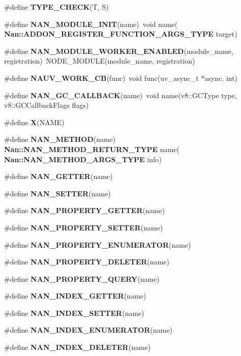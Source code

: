 \begin{DoxyCompactItemize}
\#define \textbf{ T\+Y\+P\+E\+\_\+\+C\+H\+E\+CK}(T,  S)
\item 
\#define \textbf{ N\+A\+N\+\_\+\+M\+O\+D\+U\+L\+E\+\_\+\+I\+N\+IT}(name)~void name(\textbf{ Nan\+::\+A\+D\+D\+O\+N\+\_\+\+R\+E\+G\+I\+S\+T\+E\+R\+\_\+\+F\+U\+N\+C\+T\+I\+O\+N\+\_\+\+A\+R\+G\+S\+\_\+\+T\+Y\+PE} target)
\item 
\#define \textbf{ N\+A\+N\+\_\+\+M\+O\+D\+U\+L\+E\+\_\+\+W\+O\+R\+K\+E\+R\+\_\+\+E\+N\+A\+B\+L\+ED}(module\+\_\+name,  registration)~N\+O\+D\+E\+\_\+\+M\+O\+D\+U\+LE(module\+\_\+name, registration)
\item 
\#define \textbf{ N\+A\+U\+V\+\_\+\+W\+O\+R\+K\+\_\+\+CB}(func)~void func(uv\+\_\+async\+\_\+t $\ast$async, int)
\item 
\#define \textbf{ N\+A\+N\+\_\+\+G\+C\+\_\+\+C\+A\+L\+L\+B\+A\+CK}(name)~void name(v8\+::\+G\+C\+Type type, v8\+::\+G\+C\+Callback\+Flags flags)
\item 
\#define \textbf{ X}(N\+A\+ME)
\item 
\#define \textbf{ N\+A\+N\+\_\+\+M\+E\+T\+H\+OD}(name)~\textbf{ Nan\+::\+N\+A\+N\+\_\+\+M\+E\+T\+H\+O\+D\+\_\+\+R\+E\+T\+U\+R\+N\+\_\+\+T\+Y\+PE} name(\textbf{ Nan\+::\+N\+A\+N\+\_\+\+M\+E\+T\+H\+O\+D\+\_\+\+A\+R\+G\+S\+\_\+\+T\+Y\+PE} info)
\item 
\#define \textbf{ N\+A\+N\+\_\+\+G\+E\+T\+T\+ER}(name)
\item 
\#define \textbf{ N\+A\+N\+\_\+\+S\+E\+T\+T\+ER}(name)
\item 
\#define \textbf{ N\+A\+N\+\_\+\+P\+R\+O\+P\+E\+R\+T\+Y\+\_\+\+G\+E\+T\+T\+ER}(name)
\item 
\#define \textbf{ N\+A\+N\+\_\+\+P\+R\+O\+P\+E\+R\+T\+Y\+\_\+\+S\+E\+T\+T\+ER}(name)
\item 
\#define \textbf{ N\+A\+N\+\_\+\+P\+R\+O\+P\+E\+R\+T\+Y\+\_\+\+E\+N\+U\+M\+E\+R\+A\+T\+OR}(name)
\item 
\#define \textbf{ N\+A\+N\+\_\+\+P\+R\+O\+P\+E\+R\+T\+Y\+\_\+\+D\+E\+L\+E\+T\+ER}(name)
\item 
\#define \textbf{ N\+A\+N\+\_\+\+P\+R\+O\+P\+E\+R\+T\+Y\+\_\+\+Q\+U\+E\+RY}(name)
\item 
\#define \textbf{ N\+A\+N\+\_\+\+I\+N\+D\+E\+X\+\_\+\+G\+E\+T\+T\+ER}(name)
\item 
\#define \textbf{ N\+A\+N\+\_\+\+I\+N\+D\+E\+X\+\_\+\+S\+E\+T\+T\+ER}(name)
\item 
\#define \textbf{ N\+A\+N\+\_\+\+I\+N\+D\+E\+X\+\_\+\+E\+N\+U\+M\+E\+R\+A\+T\+OR}(name)
\item 
\#define \textbf{ N\+A\+N\+\_\+\+I\+N\+D\+E\+X\+\_\+\+D\+E\+L\+E\+T\+ER}(name)

\end{DoxyCompactItemize}
